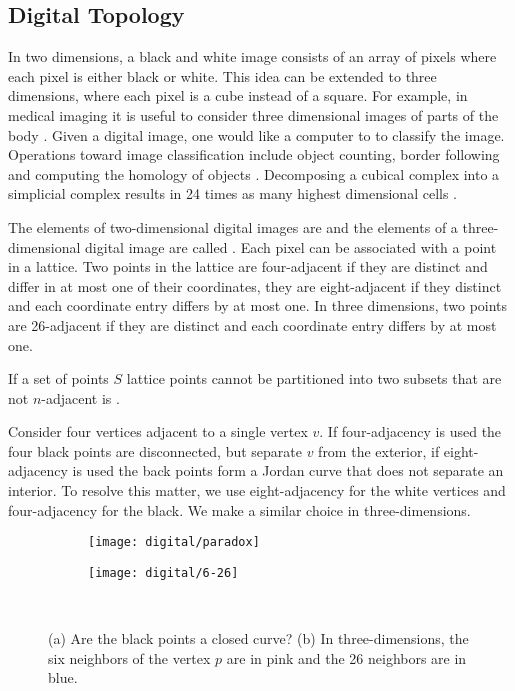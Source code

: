 \subsection{Digital Topology}
\label{sec:digital-topology}

In two dimensions, a black and white image consists of an array of pixels
where each pixel is either black or white.
This idea can be extended to three dimensions,
where each pixel is a cube instead of a square.
For example, in medical imaging it is useful to consider
three dimensional images of parts of the body \cite{bovik_handbook_2000}.
Given a digital image, one would like 
a computer to to classify the image.
Operations toward image classification include
object counting, border following and computing 
the homology of objects \cite{kong_digital_1989}.
Decomposing a cubical complex into a simplicial complex
results in 24 times as many highest dimensional cells \cite{Kaczynski2003}.


The elements of two-dimensional digital images
are  and the elements of a three-dimensional
digital image are called .
Each pixel can be associated with a point in a lattice.
Two points in the lattice are four-adjacent if
they are  distinct and differ in at most one of their
coordinates, they are eight-adjacent
if they distinct and each coordinate entry differs by at most one.
In three dimensions, two points
are 26-adjacent if they are distinct and each coordinate 
entry differs by at most one.

If a set of points $S$ lattice points cannot be
partitioned into two subsets that are not
$n$-adjacent is .

Consider four vertices adjacent to a single vertex $v$.
If four-adjacency is used the four black points are disconnected,
but separate $v$ from the exterior, if eight-adjacency is used
the back points form a Jordan curve that does not separate
an interior. To resolve this matter, we use eight-adjacency
for the white vertices and four-adjacency for the black.
We make a similar choice in three-dimensions.

\begin{figure}[htb]
        \centering
        \begin{subfigure}[b]{0.35\textwidth}
        \texttt{[image: digital/paradox]}
        \caption{}
          \label{fig:paradox}
        \end{subfigure}
          \hspace{.0cm}
         \begin{subfigure}[b]{0.40\textwidth}
        \texttt{[image: digital/6-26]}
        \caption{}
        \label{fig:6-26}
        \end{subfigure}\\
		\caption{(a) Are the black points a closed curve? (b) In three-dimensions,
		the six neighbors of the vertex $p$ are in pink and the 26 neighbors are in
		blue. 
		\label{fig:adjacency}}
\end{figure}

